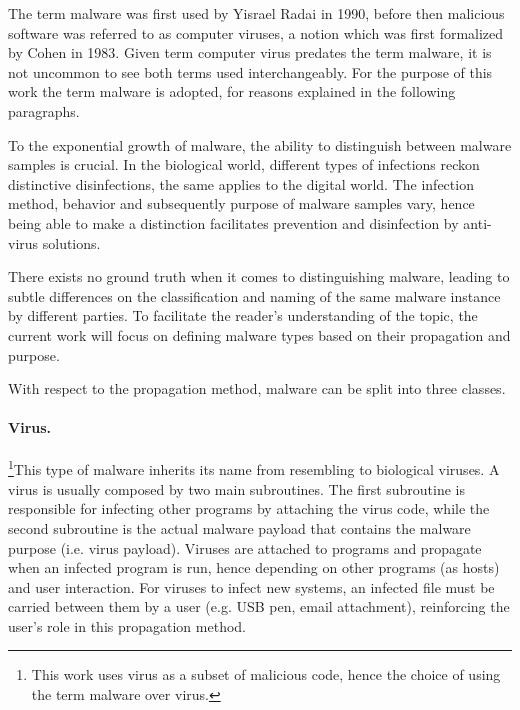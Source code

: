 \documentclass{llncs}
\begin{document}
The term malware was first used by Yisrael Radai in 1990\cite{elisan:malware}, before then malicious software was referred to as computer viruses, a notion which was first formalized by Cohen in 1983\cite{cohen:virus}. Given term computer virus predates the term malware, it is not uncommon to see both terms used interchangeably. For the purpose of this work the term malware is adopted, for reasons explained in the following paragraphs.

To the exponential growth of malware\cite{av-test:report}, the ability to distinguish between malware samples is crucial. In the biological world, different types of infections reckon distinctive disinfections, the same applies to the digital world. The infection method, behavior and subsequently purpose of malware samples vary, hence being able to make a distinction facilitates prevention and disinfection by anti-virus solutions.

There exists no ground truth when it comes to distinguishing malware, leading to subtle differences on the classification and naming of the same malware instance by different parties. To facilitate the reader's understanding of the topic, the current work will focus on defining malware types based on their propagation and purpose.

With respect to the propagation method, malware can be split into three classes\cite{kolter:learning}.

\paragraph{Virus.}\footnote{This work uses virus as a subset of malicious code, hence the choice of using the term malware over virus.}This type of malware inherits its name from resembling to biological viruses. A virus is usually composed by two main subroutines. The first subroutine is responsible for infecting other programs by attaching the virus code, while the second subroutine is the actual malware payload that contains the malware purpose (i.e. virus payload)\cite{chen:evolution}. Viruses are attached to programs and propagate when an infected program is run, hence depending on other programs (as hosts) and user interaction. For viruses to infect new systems, an infected file must be carried between them by a user (e.g. USB pen, email attachment), reinforcing the user's role in this propagation method.
\end{document}
